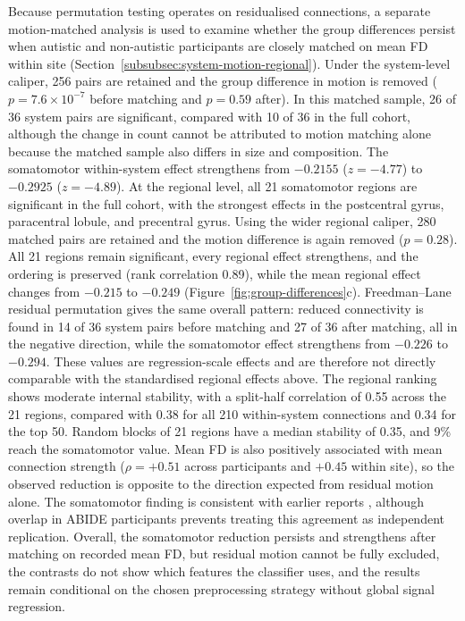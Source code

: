 Because permutation testing operates on residualised connections, a separate motion-matched analysis is used to examine whether the group differences persist when autistic and non-autistic participants are closely matched on mean FD within site (Section~\ref{subsubsec:system-motion-regional}). Under the system-level caliper, 256 pairs are retained and the group difference in motion is removed ($p=7.6\times10^{-7}$ before matching and $p=0.59$ after). In this matched sample, 26 of 36 system pairs are significant, compared with 10 of 36 in the full cohort, although the change in count cannot be attributed to motion matching alone because the matched sample also differs in size and composition. The somatomotor within-system effect strengthens from $-0.2155$ ($z=-4.77$) to $-0.2925$ ($z=-4.89$). At the regional level, all 21 somatomotor regions are significant in the full cohort, with the strongest effects in the postcentral gyrus, paracentral lobule, and precentral gyrus. Using the wider regional caliper, 280 matched pairs are retained and the motion difference is again removed ($p=0.28$). All 21 regions remain significant, every regional effect strengthens, and the ordering is preserved (rank correlation 0.89), while the mean regional effect changes from $-0.215$ to $-0.249$ (Figure~\ref{fig:group-differences}c). Freedman--Lane residual permutation gives the same overall pattern: reduced connectivity is found in 14 of 36 system pairs before matching and 27 of 36 after matching, all in the negative direction, while the somatomotor effect strengthens from $-0.226$ to $-0.294$. These values are regression-scale effects and are therefore not directly comparable with the standardised regional effects above. The regional ranking shows moderate internal stability, with a split-half correlation of 0.55 across the 21 regions, compared with 0.38 for all 210 within-system connections and 0.34 for the top 50. Random blocks of 21 regions have a median stability of 0.35, and 9\% reach the somatomotor value. Mean FD is also positively associated with mean connection strength ($\rho=+0.51$ across participants and $+0.45$ within site), so the observed reduction is opposite to the direction expected from residual motion alone. The somatomotor finding is consistent with earlier reports \citep{Chenetal2015,Holigaetal2019,Ilioskaetal2023}, although overlap in ABIDE participants prevents treating this agreement as independent replication. Overall, the somatomotor reduction persists and strengthens after matching on recorded mean FD, but residual motion cannot be fully excluded, the contrasts do not show which features the classifier uses, and the results remain conditional on the chosen preprocessing strategy without global signal regression.

